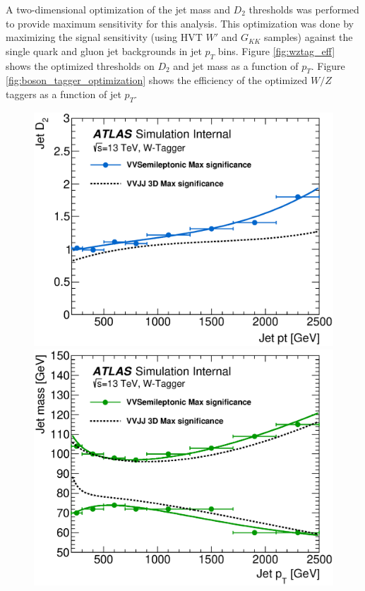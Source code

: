 A two-dimensional optimization of the jet mass and $D_{2}$ thresholds was performed to provide maximum sensitivity for this analysis. This optimization was done by maximizing the signal sensitivity (using  HVT $W'$ and $G_{KK}$ samples) against the single quark and gluon jet backgrounds in jet $p_{T}$ bins.  Figure \ref{fig:wztag_eff} shows the optimized thresholds on $D_{2}$ and jet mass as a function of $p_{T}$. Figure \ref{fig:boson_tagger_optimization} shows the efficiency of the optimized $W/Z$ taggers as a function of jet $p_{T}$. 


\begin{figure}[h]
    \includegraphics[width=0.48\hsize]{figures/Analysis/D2_W_Fit.eps}
    \includegraphics[width=0.48\hsize]{figures/Analysis/Mass_W_Fit.eps}


\end{figure}
